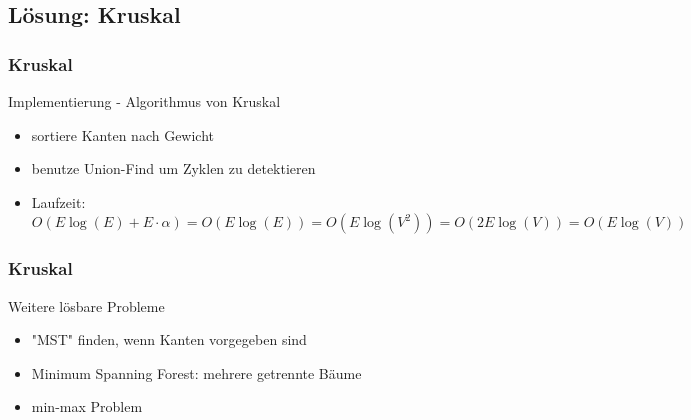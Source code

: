 \subsection{Lösung: Kruskal}

\begin{frame}
\frametitle{Kruskal}
\begin{block}{Implementierung - Algorithmus von Kruskal}
\begin{itemize}
\item sortiere Kanten nach Gewicht
\item benutze Union-Find um Zyklen zu detektieren
\item Laufzeit:\\
$O(E\log(E)+ E\cdot\alpha)=O(E\log(E))=O(E\log(V^2))=O(2E\log(V))=O(E\log(V))$
\end{itemize}
\end{block}
\end{frame}

\begin{frame}
\frametitle{Kruskal}
\begin{block}{Weitere lösbare Probleme}
\begin{itemize}
\item "MST" finden, wenn Kanten vorgegeben sind
\item Minimum Spanning Forest: mehrere getrennte Bäume
\item min-max Problem
\end{itemize}
\end{block}
\end{frame}
